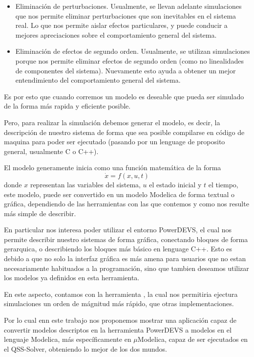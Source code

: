 \begin{itemize}
	\item Eliminación de perturbaciones. Usualmente, se llevan adelante simulaciones que nos permite eliminar perturbaciones que son inevitables en el sistema real. Lo que nos permite aislar efectos particulares, y puede conducir a mejores apreciaciones sobre el comportamiento general del sistema.

	\item Eliminación de efectos de segundo orden. Usualmente, se utilizan simulaciones porque nos permite eliminar efectos de segundo orden (como no linealidades de componentes del sistema). Nuevamente esto ayuda a obtener un mejor entendimiento del comportamiento general del sistema.
\end{itemize}

Es por esto que cuando corremos un modelo es deseable que pueda ser simulado de la forma más rapida y eficiente posible.


Pero, para realizar la simulación debemos generar el modelo, es decir, la descripción de nuestro sistema de forma que sea posible compilarse en código de maquina para poder ser ejecutado (pasando por un lenguage de proposito general, usualmente C o C++). 

El modelo generamente inicia como una función matemática de la forma 
\begin{equation*}
	\dot{x} = f(x, u, t)
\end{equation*}
donde $x$ representan las variables del sistema, $u$ el estado inicial y $t$ el tiempo, este modelo, puede ser convertido en un modelo Modelica de forma textual o gráfica, dependiendo de las herramientas con las que contemos y como nos resulte más simple de describir.

En particular nos interesa poder utilizar el entorno PowerDEVS, el cual nos permite describir nuestro sistemas de forma gráfica, conectando bloques de forma gerarquica, o describiendo los bloques más básico en lenguage C++. 
Esto es debido a que no solo la interfaz gráfica es más amena para usuarios que no estan necesariamente habituados a la programación, sino que tambien deseamos utilizar los modelos ya definidos en esta herramienta.

En este aspecto, contamos con la herramienta , la cual nos permitiria ejectura simulaciones un orden de mágnitud más rápido, que otras implementaciones.

Por lo cual enn este trabajo nos proponemos mostrar una aplicación capaz de convertir modelos descriptos en la herramienta PowerDEVS\cite{BK11} a modelos en el lenguaje Modelica\cite{Fritzson02modelica--}, más específicamente en $\mu$Modelica\cite{Ber12}, capaz de ser ejecutados en el QSS-Solver, obteniendo lo mejor de los dos mundos.


